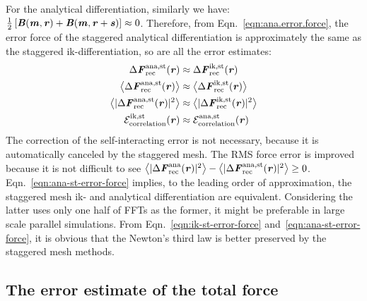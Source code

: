 \documentclass[aps,pre,preprint,unsortedaddress]{revtex4}
\renewcommand{\v}[1]{\textbf{\textit{#1}}}
\begin{document}
For the analytical differentiation, similarly we have: $\frac12\,[\v
B(\v m,\v r) + \v B(\v m, \v r+\v s)] \approx 0$. Therefore, from
Eqn.~\eqref{eqn:ana.error.force}, the error force of the staggered
analytical differentiation is approximately the same as the staggered
ik-differentiation, so are all the error estimates:
\begin{align}\label{eqn:ana-st-error-force}
  \Delta\v F^{\textrm{ana,st}}_{\textrm{rec}}(\v r)
  &\approx
  \Delta\v F^{\textrm{ik,st}}_{\textrm{rec}}(\v r)\\
  \big\langle
  \Delta\v F_{\textrm{rec}}^{\textrm{ana,st}}(\v r)
  \big\rangle
  &\approx
  \big\langle
  \Delta\v F_{\textrm{rec}}^{\textrm{ik,st}}(\v r)
  \big\rangle\\
  \big\langle
  \vert\Delta\v F_{\textrm{rec}}^{\textrm{ana,st}}(\v r)\vert^2
  \big\rangle
  &\approx
  \big\langle
  \vert\Delta\v F_{\textrm{rec}}^{\textrm{ik,st}}(\v r)\vert^2
  \big\rangle\\
  \mathcal E^{\textrm{ik,st}}_{\textrm{correlation}}(\v r)
  &\approx
  \mathcal E^{\textrm{ana,st}}_{\textrm{correlation}}(\v r)
\end{align}
The correction of the self-interacting error is not necessary,
because it is automatically canceled by the staggered mesh.
The RMS force error is improved because it is not
difficult to see 
$\big\langle\vert\Delta\v F_{\textrm{rec}}^{\textrm{ana}}(\v r)\vert^2\big\rangle -
\big\langle\vert\Delta\v F_{\textrm{rec}}^{\textrm{ana,st}}(\v r)\vert^2\big\rangle
\geq 0$.
Eqn.~\eqref{eqn:ana-st-error-force} implies, to the
leading order of approximation, the staggered
mesh ik- and analytical differentiation
are equivalent. Considering the latter uses
only one half of  FFTs as the former, it might be preferable
in large scale parallel simulations.
From Eqn.~\eqref{eqn:ik-st-error-force}
and~\eqref{eqn:ana-st-error-force}, it is obvious that the Newton's
third law is better preserved by the staggered mesh methods.



\subsection{The error estimate of the total force}
\end{document}
